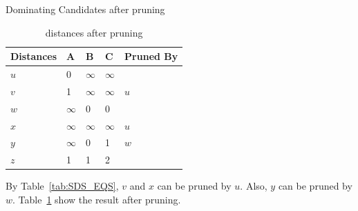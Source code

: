 \begin{frame}{Dominating Candidates after pruning}
    \begin{table}[h]
    \begin{tabular}{lllll}
    \hline
    Distances & A & B & C & Pruned By\\ \hline
    $u$       & 0 & $\infty$ & $\infty$ &\\ \hline
    $v$       & 1 & $\infty$ & $\infty$ & $u$\\ \hline
    $w$       & $\infty$ & 0 & 0 &\\ \hline
    $x$       & $\infty$ & $\infty$ & $\infty$ & $u$\\ \hline
    $y$       & $\infty$ & 0 & 1 & $w$\\ \hline
    $z$       & 1 & 1 & 2 &\\ \hline
    \end{tabular}
    \caption{\label{font-table} distances after pruning}
    \label{tab:dom_cand_pruned}
    \end{table}
    By Table~\ref{tab:SDS_EQS}, $v$ and $x$ can be pruned by $u$. Also, $y$ can be pruned by $w$. Table~\ref{tab:dom_cand_pruned} show the result after pruning.
\end{frame}

